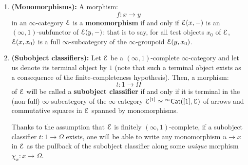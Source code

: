                 \begin{definition} \label{def: subobject_classifiers}
                    \noindent
                    \begin{enumerate}
                        \item \textbf{(Monomorphisms):} A morphism:
                            $$f: x \to y$$
                        in an $\infty$-category $\mathcal{E}$ is a \textbf{monomorphism} if and only if $\mathcal{E}(x, -)$ is an $(\infty, 1)$-subfunctor of $\mathcal{E}(y, -)$: that is to say, for all test objects $x_0$ of $\mathcal{E}$, $\mathcal{E}(x, x_0)$ is a full $\infty$-subcategory of the $\infty$-groupoid $\mathcal{E}(y, x_0)$. 
                        \item \textbf{(Subobject classifiers):} Let $\mathcal{E}$ be a $(\infty, 1)$-complete $\infty$-category and let us denote its terminal object by $1$ (note that such a terminal object exists as a consequence of the finite-completeness hypothesis). Then, a morphism:
                            $$t: 1 \to \Omega$$
                        of $\mathcal{E}$ will be called a \textbf{subobject classifier} if and only if it is terminal in the (non-full) $\infty$-subcategory of the $\infty$-category $\mathcal{E}^{[1]} \simeq {}^{\infty}\mathsf{Cat}([1], \mathcal{E})$ of arrows and commutative squares in $\mathcal{E}$ spanned by monomorphisms.
                        
                        Thanks to the assumption that $\mathcal{E}$ is finitely $(\infty, 1)$-complete, if a subobject classifier $t: 1 \to \Omega$ exists, one will be able to write any monomorphism $u \to x$ in $\mathcal{E}$ as the pullback of the subobject classifier along some \textit{unique} morphism $\chi_x: x \to \Omega$.
                    \end{enumerate}
                \end{definition}
                
